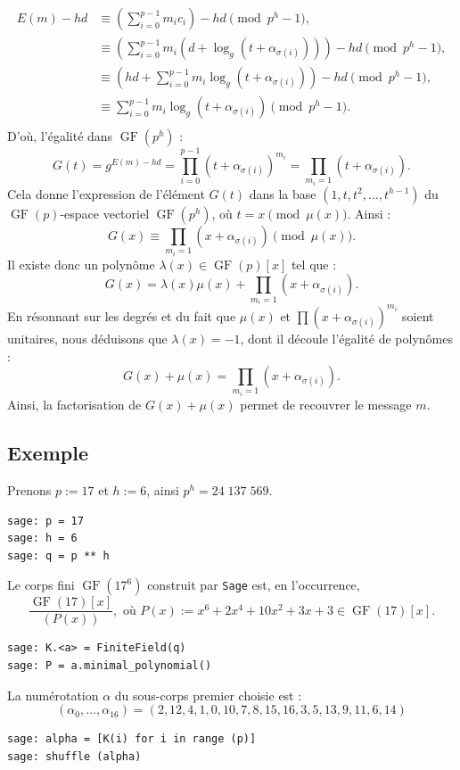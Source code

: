 \documentclass[a4paper, titlepage, 11pt]{article}
\theoremstyle{definition}
\theoremstyle{remark}
\def\gf{\operatorname{GF}}
\begin{document}
\begin{align*}
E(m) - hd &\equiv \left(\sum_{i=0}^{p-1} m_ic_i\right) - hd \pmod{p^h-1}, \\
&\equiv \left(\sum_{i=0}^{p-1} m_i\left(d + \log_g\left(t + \alpha_{\sigma(i)}\right)\right)\right) - hd \pmod{p^h-1}, \\
&\equiv \left(hd + \sum_{i=0}^{p-1} m_i\log_g\left(t + \alpha_{\sigma(i)}\right)\right) - hd \pmod{p^h-1}, \\
&\equiv  \sum_{i=0}^{p-1} m_i\log_g\left(t + \alpha_{\sigma(i)}\right) \pmod{p^h-1}. \\
\end{align*}
D'où, l'égalité dans $\gf(p^h)$ : 
$$G(t) = g^{E(m) - hd} = \prod_{i=0}^{p-1} \left(t+\alpha_{\sigma(i)}\right)^{m_i} = \prod_{m_i = 1} \left(t+\alpha_{\sigma(i)}\right).$$
Cela donne l'expression de l'élément $G(t)$ dans la base $(1,t,t^2, \dots, t^{h-1})$ du $\gf(p)$-espace vectoriel $\gf(p^h)$, où $t = x \pmod{\mu(x)}$. Ainsi :
$$G(x) \equiv \prod_{m_i = 1} \left(x+\alpha_{\sigma(i)}\right) \pmod{\mu(x)}.$$
Il existe donc un polynôme $\lambda(x) \in \gf(p)[x]$ tel que : $$G(x) = \lambda(x) \mu(x) + \prod_{m_i = 1} \left(x+\alpha_{\sigma(i)}\right).$$
En résonnant sur les degrés et du fait que $\mu(x)$ et $\prod \left(x+\alpha_{\sigma(i)}\right)^{m_i}$ soient unitaires, nous déduisons que $\lambda(x) = -1$, dont il découle l'égalité de polynômes :
$$G(x) + \mu(x) = \prod_{m_i = 1} \left(x+\alpha_{\sigma(i)}\right).$$
Ainsi, la factorisation de $G(x)+\mu(x)$ permet de recouvrer le message $m$.

\subsection{Exemple}
Prenons $p := 17$ et $h := 6$, ainsi $p^h = 24\;137\;569$.
\begin{verbatim}
sage: p = 17
sage: h = 6
sage: q = p ** h
\end{verbatim}
Le corps fini $\gf(17^6)$ construit par \verb|Sage| est, en l’occurrence, 
$$\frac{\gf(17)[x]}{(P(x))}, \text{ où } P(x) := x^6 + 2x^4 + 10 x^2 +3x +3\in  \gf(17)[x].$$
\begin{verbatim}
sage: K.<a> = FiniteField(q)
sage: P = a.minimal_polynomial()
\end{verbatim}
La numérotation $\alpha$ du sous-corps premier choisie est :
$$(\alpha_0, \dots, \alpha_{16}) = (2, 12, 4, 1, 0, 10, 7, 8, 15, 16, 3, 5, 13, 9, 11, 6, 14)$$
\begin{verbatim}
sage: alpha = [K(i) for i in range (p)]
sage: shuffle (alpha)
\end{verbatim}
\end{document}
